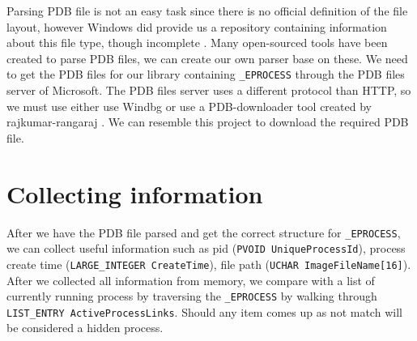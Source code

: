 Parsing PDB file is not an easy task since there is no official definition of the file layout, however Windows did provide us a repository containing information about this file type, though incomplete \cite{microsoft-pdb}. Many open-sourced tools have been created to parse PDB files, we can create our own parser base on these. We need to get the PDB files for our library containing \texttt{\_EPROCESS} through the PDB files server of Microsoft. The PDB files server uses a different protocol than HTTP, so we must use either use Windbg or use a PDB-downloader tool created by rajkumar-rangaraj \cite{pdb-downloader}. We can resemble this project to download the required PDB file.

\section[Collecting information]{Collecting information}

After we have the PDB file parsed and get the correct structure for \texttt{\_EPROCESS}, we can collect useful information such as pid (\texttt{PVOID UniqueProcessId}), process create time (\texttt{LARGE\_INTEGER CreateTime}), file path (\texttt{UCHAR ImageFileName[16]}). After we collected all information from memory, we compare with a list of currently running process by traversing the \texttt{\_EPROCESS} by walking through \texttt{LIST\_ENTRY ActiveProcessLinks}. Should any item comes up as not match will be considered a hidden process.


